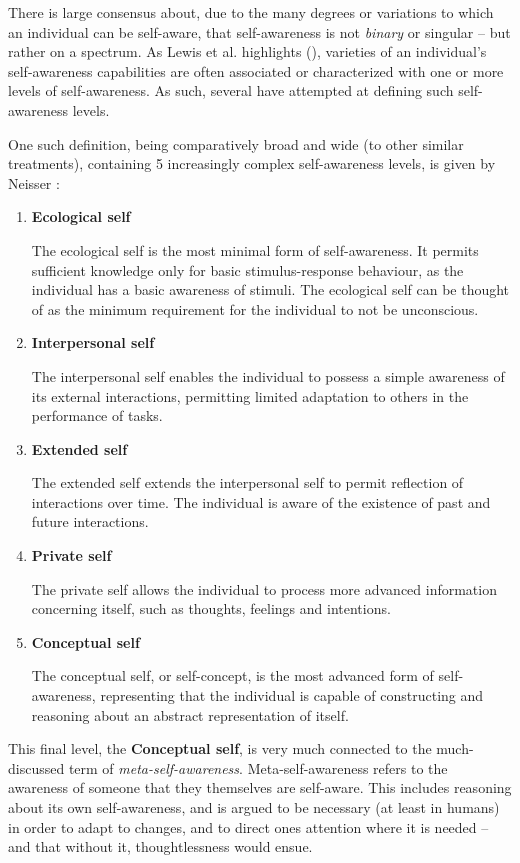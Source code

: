 	There is large consensus about, due to the many degrees or variations to which an individual can be self-aware, that self-awareness is not \textit{binary} or singular -- but rather on a spectrum. As Lewis et al. highlights (\cite{sacs16_ch2, sacs17_ch3}), varieties of an individual's self-awareness capabilities are often associated or characterized with one or more levels of self-awareness. As such, several have attempted at defining such self-awareness levels.

	One such definition, being comparatively broad and wide (to other similar treatments), containing 5 increasingly complex self-awareness levels, is given by Neisser \cite{neisser284}:

	\begin{enumerate}
		\item \textbf{Ecological self}
		
		The ecological self is the most minimal form of self-awareness. It permits sufficient knowledge only for basic stimulus-response behaviour, as the individual has a basic awareness of stimuli. The ecological self can be thought of as the minimum requirement for the individual to not be unconscious.
		\item \textbf{Interpersonal self}
		
		The interpersonal self enables the individual to possess a simple awareness of its external interactions, permitting limited adaptation to others in the performance of tasks.
		\item \textbf{Extended self}
		
		The extended self extends the interpersonal self to permit reflection of interactions over time. The individual is aware of the existence of past and future interactions.
		\item \textbf{Private self}
		
		The private self allows the individual to process more advanced information concerning itself, such as thoughts, feelings and intentions.
		
		\item \textbf{Conceptual self}
		
		The conceptual self, or self-concept, is the most advanced form of self-awareness, representing that the individual is capable of constructing and reasoning about an abstract representation of itself.
	\end{enumerate}

	This final level, the \textbf{Conceptual self}, is very much connected to the much-discussed term of \textit{meta-self-awareness}. Meta-self-awareness refers to the awareness of someone that they themselves are self-aware. This includes reasoning about its own self-awareness, and is argued to be necessary (at least in humans) in order to adapt to changes, and to direct ones attention where it is needed -- and that without it, thoughtlessness would ensue.

